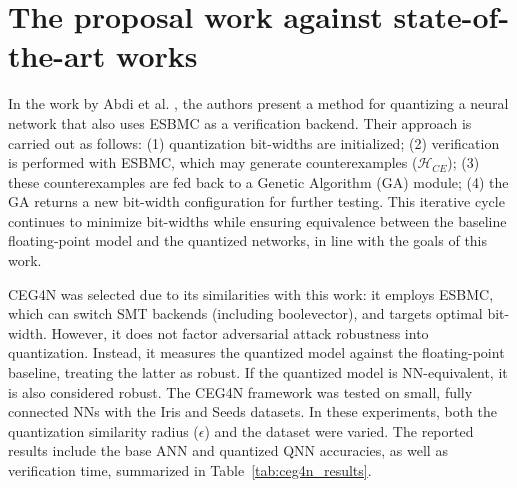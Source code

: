 

\section{The proposal work against state-of-the-art works}\label{sec:comparison_against_state_of_the_art}

In the work by Abdi et al.  \cite{abdi2021counterexample}, the authors present a method for quantizing a neural network that also uses ESBMC as a verification backend. Their approach is carried out as follows: (1) quantization bit-widths are initialized; (2) verification is performed with ESBMC, which may generate counterexamples ($\mathcal{H}_{CE}$); (3) these counterexamples are fed back to a Genetic Algorithm (GA) module; (4) the GA returns a new bit-width configuration for further testing. This iterative cycle continues to minimize bit-widths while ensuring equivalence between the baseline floating-point model and the quantized networks, in line with the goals of this work.


CEG4N was selected due to its similarities with this work: it employs ESBMC, which can switch SMT backends (including boolevector), and targets optimal bit-width. However, it does not factor adversarial attack robustness into quantization. Instead, it measures the quantized model against the floating-point baseline, treating the latter as robust. If the quantized model is NN-equivalent, it is also considered robust. The CEG4N framework was tested on small, fully connected NNs with the Iris and Seeds datasets. In these experiments, both the quantization similarity radius ($\epsilon$) and the dataset were varied. The reported results include the base ANN and quantized QNN accuracies, as well as verification time, summarized in Table~\ref{tab:ceg4n_results}. 



